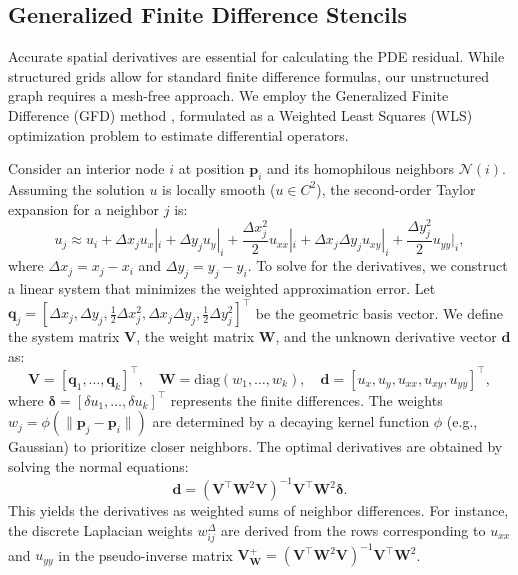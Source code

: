 \documentclass[11pt]{article}
\theoremstyle{definition}
\theoremstyle{remark}
\theoremstyle{plain}
\begin{document}
\subsection{Generalized Finite Difference Stencils}
\label{sec:gfd}

Accurate spatial derivatives are essential for calculating the PDE residual. While structured grids allow for standard finite difference formulas, our unstructured graph requires a mesh-free approach. We employ the Generalized Finite Difference (GFD) method \cite{liszka1980finite, benito2001influence}, formulated as a Weighted Least Squares (WLS) optimization problem to estimate differential operators.

Consider an interior node $i$ at position $\mathbf{p}_i$ and its homophilous neighbors $\mathcal{N}(i)$. Assuming the solution $u$ is locally smooth ($u \in C^2$), the second-order Taylor expansion for a neighbor $j$ is:
\begin{equation}
    u_j \approx u_i + \Delta x_j u_x|_i + \Delta y_j u_y|_i + \frac{\Delta x_j^2}{2} u_{xx}|_i + \Delta x_j \Delta y_j u_{xy}|_i + \frac{\Delta y_j^2}{2} u_{yy}|_i,
\end{equation}
where $\Delta x_j = x_j - x_i$ and $\Delta y_j = y_j - y_i$. To solve for the derivatives, we construct a linear system that minimizes the weighted approximation error. Let $\mathbf{q}_j = [\Delta x_j, \Delta y_j, \frac{1}{2}\Delta x_j^2, \Delta x_j \Delta y_j, \frac{1}{2}\Delta y_j^2]^\top$ be the geometric basis vector. We define the system matrix $\mathbf{V}$, the weight matrix $\mathbf{W}$, and the unknown derivative vector $\mathbf{d}$ as:
\begin{equation}
    \mathbf{V} = [\mathbf{q}_1, \dots, \mathbf{q}_k]^\top, \quad
    \mathbf{W} = \text{diag}(w_1, \dots, w_k), \quad
    \mathbf{d} = [u_x, u_y, u_{xx}, u_{xy}, u_{yy}]^\top,
\end{equation} 
where $\boldsymbol{\delta} = [\delta u_1, \dots, \delta u_k]^\top$ represents the finite differences. The weights $w_j = \phi(\|\mathbf{p}_j - \mathbf{p}_i\|)$ are determined by a decaying kernel function $\phi$ (e.g., Gaussian) to prioritize closer neighbors. The optimal derivatives are obtained by solving the normal equations:
\begin{equation}
    \mathbf{d} = (\mathbf{V}^\top \mathbf{W}^2 \mathbf{V})^{-1} \mathbf{V}^\top \mathbf{W}^2 \boldsymbol{\delta}.
\end{equation}
This yields the derivatives as weighted sums of neighbor differences. For instance, the discrete Laplacian weights $w_{ij}^{\Delta}$ are derived from the rows corresponding to $u_{xx}$ and $u_{yy}$ in the pseudo-inverse matrix $\mathbf{V}^+_{\mathbf{W}} = (\mathbf{V}^\top \mathbf{W}^2 \mathbf{V})^{-1} \mathbf{V}^\top \mathbf{W}^2$.
\end{document}
